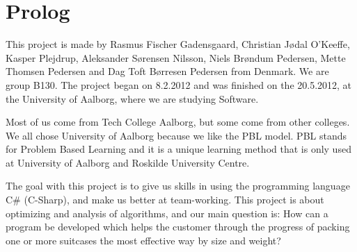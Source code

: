 \chapter{Prolog}

This project is made by Rasmus Fischer Gadensgaard, Christian Jødal O’Keeffe, Kasper Plejdrup, Aleksander Sørensen Nilsson, Niels Brøndum Pedersen, Mette Thomsen Pedersen and Dag Toft Børresen Pedersen from Denmark. We are group B130. The project began on 8.2.2012 and was finished on the 20.5.2012, at the University of Aalborg, where we are studying Software.

Most of us come from Tech College Aalborg, but some come from other colleges. We all chose University of Aalborg because we like the PBL model. PBL stands for Problem Based Learning and it is a unique learning method that is only used at University of Aalborg and Roskilde University Centre.

The goal with this project is to give us skills in using the programming language C\# (C-Sharp), and make us better at team-working. This project is about optimizing and analysis of algorithms, and our main question is: How can a program be developed which helps the customer through the progress of packing one or more suitcases the most effective way by size and weight?
